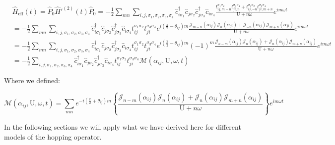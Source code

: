 \begin{align}
&\hat{H}_{\text{eff}}(t) = \hat{P}_0\hat{H}'^{(2)}(t)\hat{P}_0 = - \frac{1}{2}\sum_{mn} \sum_{i,j, \sigma_1, \sigma_2, \sigma_3, \sigma_4}\hat{c}_{i \sigma_1}^\dagger \hat{c}_{j \sigma_2} \hat{c}_{j \sigma_3}^\dagger \hat{c}_{i \sigma_4} \frac{t_{ij,m-n}^{\sigma_1 \sigma_2} t_{ji,n}^{\sigma_3 \sigma_4} + t_{ij,-n}^{\sigma_1 \sigma_2} t_{ji,m+n}^{\sigma_3 \sigma_4}}{\text{U}+n\omega} e^{im\omega t} \nonumber \\
&= - \frac{1}{2}\sum_{mn} \sum_{i,j, \sigma_1, \sigma_2, \sigma_3, \sigma_4}\hat{c}_{i \sigma_1}^\dagger \hat{c}_{j \sigma_2} \hat{c}_{j \sigma_3}^\dagger \hat{c}_{i \sigma_4} t_{ij}^{\sigma_1 \sigma_2} t_{ji}^{\sigma_3 \sigma_4} e^{i(\frac{\pi}{2}-\theta_{ij})m} \frac{ \mathcal{J}_{m-n}(\alpha_{ij}) \mathcal{J}_{n}(\alpha_{ji}) + \mathcal{J}_{-n}(\alpha_{ij}) \mathcal{J}_{m+n}(\alpha_{ji})}{\text{U}+n\omega} e^{im\omega t} \nonumber \\
&= - \frac{1}{2}\sum_{mn} \sum_{i,j, \sigma_1, \sigma_2, \sigma_3, \sigma_4}\hat{c}_{i \sigma_1}^\dagger \hat{c}_{j \sigma_2} \hat{c}_{j \sigma_3}^\dagger \hat{c}_{i \sigma_4} t_{ij}^{\sigma_1 \sigma_2} t_{ji}^{\sigma_3 \sigma_4} e^{i(\frac{\pi}{2}-\theta_{ij})m} (-1)^m \frac{ \mathcal{J}_{n-m}(\alpha_{ij}) \mathcal{J}_{n}(\alpha_{ij}) + \mathcal{J}_{n}(\alpha_{ij}) \mathcal{J}_{m+n}(\alpha_{ij})}{\text{U}+n\omega} e^{im\omega t} \nonumber \\
&= - \frac{1}{2} \sum_{i,j, \sigma_1, \sigma_2, \sigma_3, \sigma_4}\hat{c}_{i \sigma_1}^\dagger \hat{c}_{j \sigma_2} \hat{c}_{j \sigma_3}^\dagger \hat{c}_{i \sigma_4} t_{ij}^{\sigma_1 \sigma_2} t_{ji}^{\sigma_3 \sigma_4} \mathcal{M}(\alpha_{ij}, \text{U}, \omega, t) \label{HeffSimplified}
\end{align}

Where we defined:

\begin{equation}
\mathcal{M}(\alpha_{ij}, \text{U}, \omega, t) = \sum_{mn}e^{-i(\frac{\pi}{2}+\theta_{ij})m} \left\{ 
    \frac{\mathcal{J}_{n-m}(\alpha_{ij})\mathcal{J}_{n}(\alpha_{ij}) + \mathcal{J}_{n}(\alpha_{ij})\mathcal{J}_{m+n}(\alpha_{ij})}{\text{U}+n\omega} \right\}e^{im\omega t}
\end{equation}

In the following sections we will apply what we have derived here for different models of the hopping operator.